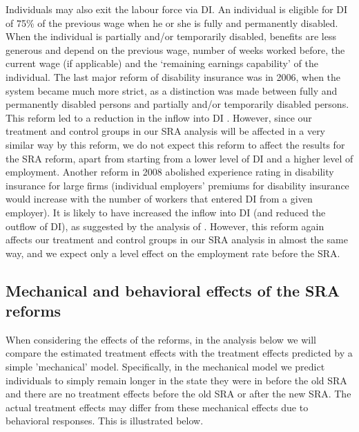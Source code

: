 \documentclass[12pt,a4paper]{article}
\begin{document}
Individuals may also exit the labour force via DI. An individual is eligible for DI of 75\% of the previous wage when he or she is fully and permanently disabled. When the individual is partially and/or temporarily disabled, benefits are less generous and depend on the previous wage, number of weeks worked before, the current wage (if applicable) and the `remaining earnings capability'  of the individual. The last major reform of disability insurance was in 2006, when the system became much more strict, as a distinction was made between fully and permanently disabled persons and partially and/or temporarily disabled persons. This reform led to a reduction in the inflow into DI \citep[see e.g.][]{koning_lindeboom_2015}. However, since our treatment and control groups in our SRA analysis will be affected in a very similar way by this reform, we do not expect this reform to affect the results for the SRA reform, apart from starting from a lower level of DI and a higher level of employment. Another reform in 2008 abolished experience rating in disability insurance for large firms (individual employers' premiums for disability insurance would increase with the number of workers that entered DI from a given employer). It is likely to have increased the inflow into DI (and reduced the outflow of DI), as suggested by the analysis of \cite{groot_koning_2016}. However, this reform again affects our treatment and control groups in our SRA analysis in almost the same way, and we expect only a level effect on the employment rate before the SRA. 

\subsection{Mechanical and behavioral effects of the SRA reforms}\label{mechanical_model}

When considering the effects of the reforms, in the analysis below we will compare the estimated treatment effects with the treatment effects predicted by a simple 'mechanical' model. Specifically, in the mechanical model we predict individuals to simply remain longer in the state they were in before the old SRA and there are no treatment effects before the old SRA or after the new SRA. The actual treatment effects may differ from these mechanical effects due to behavioral responses. This is illustrated below. 
\end{document}
